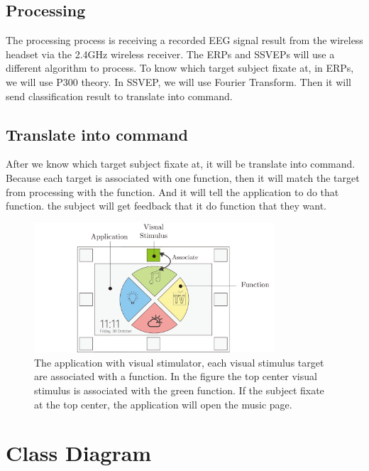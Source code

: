 \subsection{Processing}
\hspace{1.5cm}The processing process is receiving a recorded EEG signal result from the wireless headset via the 2.4GHz wireless receiver. The ERPs and SSVEPs will use a different algorithm to process. To know which target subject fixate at, in ERPs, we will use P300 theory. In SSVEP, we will use Fourier Transform. Then it will send classification result to translate into command.



\subsection{Translate into command}
\hspace{1.5cm} After we know which target subject fixate at, it will be translate into command. Because each target is associated with one function, then it will match the target from processing with the function. And it will tell the application to do that function. the subject will get feedback that it do function that they want.

\begin{figure}[ht]
	\centering
	\includegraphics[width=0.8\textwidth]{chapter5/associate.pdf}
	\caption{The application with visual stimulator, each visual stimulus target are associated with a function. In the figure the top center visual stimulus is associated with the green function. If the subject fixate at the top center, the application will open the music page. }
\end{figure}

\newpage
\section{Class Diagram}

